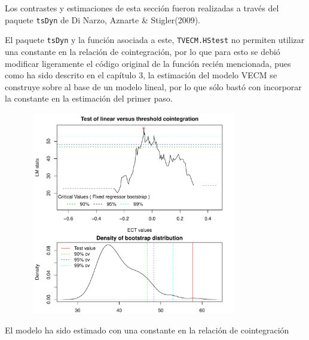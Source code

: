 \documentclass[12pt, twoside]{book}\usepackage[]{graphicx}\usepackage[]{color}
\newenvironment{knitrout}{}{} %
\numberwithin{equation}{section}
\numberwithin{theorem}{section}
\numberwithin{teorema}{section}
\numberwithin{defi}{section}
\numberwithin{prop}{section}
\numberwithin{defi}{section}
\theoremstyle{plain}
\begin{document}
Los contrastes y estimaciones de esta sección fueron realizadas a través del paquete \texttt{tsDyn} de Di Narzo, Aznarte \& Stigler(2009).

El paquete \texttt{tsDyn} y la función asociada a este, \texttt{TVECM.HStest} no permiten utilizar una constante en la relación de cointegración, por lo que para esto se debió modificar ligeramente el código original de la función recién mencionada, pues como ha sido descrito en el capítulo 3, la estimación del modelo VECM se construye sobre al base de un modelo lineal, por lo que sólo bastó con incorporar la constante en la estimación del primer paso. 

\begin{knitrout}
\color{fgcolor}

{\centering \includegraphics[width=4.5in,height=3.5in]{figure/unnamed-chunk-32-1} 

}



\end{knitrout}


El modelo ha sido estimado con una constante en la relación de cointegración
\end{document}

